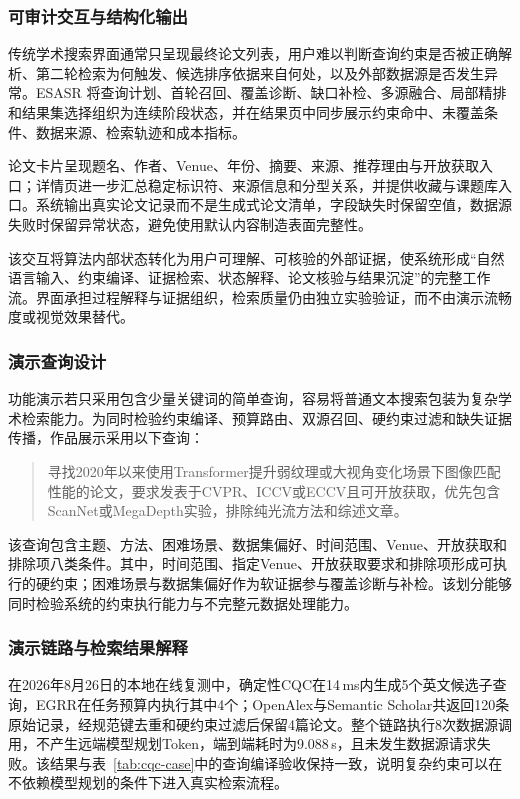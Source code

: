 \documentclass[a4paper,12pt,fontset=none]{ctexart}
\begin{document}
\subsubsection{可审计交互与结构化输出}

传统学术搜索界面通常只呈现最终论文列表，用户难以判断查询约束是否被正确解析、第二轮检索为何触发、候选排序依据来自何处，以及外部数据源是否发生异常。ESASR 将查询计划、首轮召回、覆盖诊断、缺口补检、多源融合、局部精排和结果集选择组织为连续阶段状态，并在结果页中同步展示约束命中、未覆盖条件、数据来源、检索轨迹和成本指标。

论文卡片呈现题名、作者、Venue、年份、摘要、来源、推荐理由与开放获取入口；详情页进一步汇总稳定标识符、来源信息和分型关系，并提供收藏与课题库入口。系统输出真实论文记录而不是生成式论文清单，字段缺失时保留空值，数据源失败时保留异常状态，避免使用默认内容制造表面完整性。

该交互将算法内部状态转化为用户可理解、可核验的外部证据，使系统形成“自然语言输入、约束编译、证据检索、状态解释、论文核验与结果沉淀”的完整工作流。界面承担过程解释与证据组织，检索质量仍由独立实验验证，而不由演示流畅度或视觉效果替代。

\subsubsection{演示查询设计}

功能演示若只采用包含少量关键词的简单查询，容易将普通文本搜索包装为复杂学术检索能力。为同时检验约束编译、预算路由、双源召回、硬约束过滤和缺失证据传播，作品展示采用以下查询：

\begin{quote}
	\small
	寻找2020年以来使用Transformer提升弱纹理或大视角变化场景下图像匹配性能的论文，要求发表于CVPR、ICCV或ECCV且可开放获取，优先包含ScanNet或MegaDepth实验，排除纯光流方法和综述文章。
\end{quote}

该查询包含主题、方法、困难场景、数据集偏好、时间范围、Venue、开放获取和排除项八类条件。其中，时间范围、指定Venue、开放获取要求和排除项形成可执行的硬约束；困难场景与数据集偏好作为软证据参与覆盖诊断与补检。该划分能够同时检验系统的约束执行能力与不完整元数据处理能力。

\subsubsection{演示链路与检索结果解释}

在2026年8月26日的本地在线复测中，确定性CQC在14\,ms内生成5个英文候选子查询，EGRR在任务预算内执行其中4个；OpenAlex与Semantic Scholar共返回120条原始记录，经规范键去重和硬约束过滤后保留4篇论文。整个链路执行8次数据源调用，不产生远端模型规划Token，端到端耗时为9.088\,s，且未发生数据源请求失败。该结果与表~\ref{tab:cqc-case}中的查询编译验收保持一致，说明复杂约束可以在不依赖模型规划的条件下进入真实检索流程。
\end{document}
